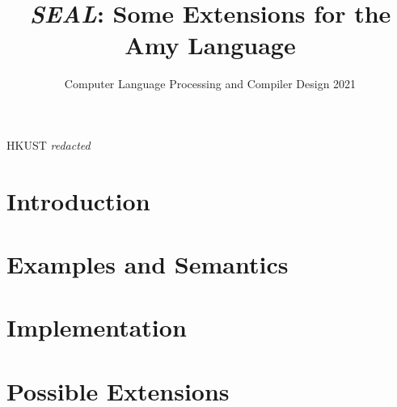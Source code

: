 \documentclass[nocopyrightspace,11pt,authoryear,preprint]{sigplanconf}
\begin{document}


\title{\textit{SEAL}: Some Extensions for the Amy Language}
\subtitle{Computer Language Processing and Compiler Design 2021}

           {HKUST}
           {\textit{redacted}}

\maketitle

\section{Introduction}


\section{Examples and Semantics}


\section{Implementation}


\section{Possible Extensions}




\end{document}
